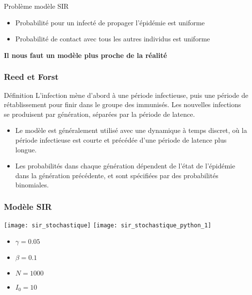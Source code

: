 \begin{frame}
    \begin{block}{Problème modèle SIR}
        \begin{itemize}
            \item Probabilité pour un infecté de propager l'épidémie est uniforme
            \item Probabilité de contact avec tous les autres individus est uniforme
        \end{itemize}
    \end{block}

    \begin{center}
        \bf Il nous faut un modèle plus proche de la réalité
    \end{center}
\end{frame}


\begin{frame}
    \frametitle{Reed et Forst}

    \begin{block}{Définition}
        L'infection mène d'abord à une période infectieuse, puis une période de rétablissement pour finir dans le groupe des immunisés. Les nouvelles infections se produisent par génération, séparées par la période de latence.
    \end{block}

    \begin{itemize}
        \item Le modèle est généralement utilisé avec une dynamique à temps discret, où la période infectieuse est courte et précédée d’une période de latence plus longue.
        \item Les probabilités dans chaque génération dépendent de l’état de l’épidémie dans la génération précédente, et sont spécifiées par des probabilités binomiales.
    \end{itemize}
\end{frame}

\begin{frame}
        \frametitle{Modèle SIR}

        \texttt{[image: sir\_stochastique]}%
        \texttt{[image: sir\_stochastique\_python\_1]}

        \begin{multicols}{2}
            \begin{itemize}
                    \item $\gamma = 0.05$
                    \item $\beta = 0.1$
                    \item $N = 1000$
                    \item $I_0 = 10$
            \end{itemize}
        \end{multicols}

\end{frame}

